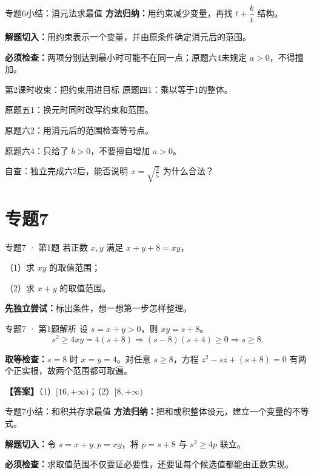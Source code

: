 \documentclass[UTF8,10pt,aspectratio=169]{ctexbeamer}
\newcommand{\Answer}[1]{\par\vspace{0.2cm}\textbf{【答案】}#1}
\begin{document}
\begin{frame}[t]{专题6小结：消元法求最值}
\textbf{方法归纳：}用约束减少变量，再找 $t+\dfrac{k}{t}$ 结构。\par\vspace{0.4cm}
\textbf{解题切入：}用约束表示一个变量，并由原条件确定消元后的范围。\par\vspace{0.4cm}
\textbf{必须检查：}两项分别达到最小时可能不在同一点；原题六4未规定 $a>0$，不得擅加。
\end{frame}
\begin{frame}[t]{第2课时收束：把约束用进目标}
原题四1：乘以等于1的整体。\par\vspace{0.3cm}
原题五1：换元时同时改写约束和范围。\par\vspace{0.3cm}
原题六2：用消元后的范围检查等号点。\par\vspace{0.4cm}
原题六4：只给了 $b>0$，不要擅自增加 $a>0$。\par\vspace{0.3cm}
自查：独立完成六2后，能否说明 $x=\sqrt{\frac{2}{5}}$ 为什么合法？
\end{frame}
\section{专题7}
\begin{frame}[t]{专题7 · 第1题}
若正数 $x,y$ 满足 $x+y+8=xy$，\par（1）求 $xy$ 的取值范围；\par（2）求 $x+y$ 的取值范围。
\par\vspace{0.3cm}\textbf{先独立尝试：}标出条件，想一想第一步怎样整理。
\end{frame}
\begin{frame}[t]{专题7 · 第1题解析}
设 $s=x+y>0$，则 $xy=s+8$。\[s^2\ge4xy=4(s+8)\Rightarrow(s-8)(s+4)\ge0\Rightarrow s\ge8.\]
\pause
\par\vspace{0.2cm}\textbf{取等检查：}$s=8$ 时 $x=y=4$。对任意 $s\ge8$，方程 $z^2-sz+(s+8)=0$ 有两个正实根，故两个范围都可取遍。
\Answer{（1）$[16,+\infty)$；（2）$[8,+\infty)$}
\end{frame}
\begin{frame}[t]{专题7小结：和积共存求最值}
\textbf{方法归纳：}把和或积整体设元，建立一个变量的不等式。\par\vspace{0.4cm}
\textbf{解题切入：}令 $s=x+y,p=xy$，将 $p=s+8$ 与 $s^2\ge4p$ 联立。\par\vspace{0.4cm}
\textbf{必须检查：}求取值范围不仅要证必要性，还要证每个候选值都能由正数实现。
\end{frame}
\end{document}
